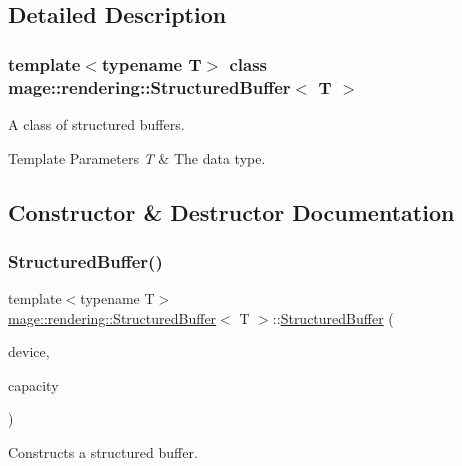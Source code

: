 \subsection{Detailed Description}
\subsubsection*{template$<$typename T$>$\newline
class mage\+::rendering\+::\+Structured\+Buffer$<$ T $>$}

A class of structured buffers.


\begin{DoxyTemplParams}{Template Parameters}
{\em T} & The data type. \\
\hline
\end{DoxyTemplParams}


\subsection{Constructor \& Destructor Documentation}
\mbox{\label{classmage_1_1rendering_1_1_structured_buffer_a2abc009cf0cca2add8bb2b19ec2f89d1}} 
\subsubsection{\texorpdfstring{Structured\+Buffer()}{StructuredBuffer()}\hspace{0.1cm}{\footnotesize\ttfamily [1/3]}}
{\footnotesize\ttfamily template$<$typename T$>$ \\
\mbox{\hyperlink{classmage_1_1rendering_1_1_structured_buffer}{mage\+::rendering\+::\+Structured\+Buffer}}$<$ T $>$\+::\mbox{\hyperlink{classmage_1_1rendering_1_1_structured_buffer}{Structured\+Buffer}} (\begin{DoxyParamCaption}\item[{I\+D3\+D11\+Device \&}]{device,  }\item[{std\+::size\+\_\+t}]{capacity }\end{DoxyParamCaption})\hspace{0.3cm}{\ttfamily [explicit]}}

Constructs a structured buffer.


